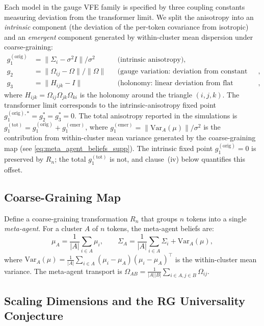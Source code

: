 \documentclass[twoside,11pt]{article}
\begin{document}
Each model in the gauge VFE family is specified by three coupling constants measuring deviation from the transformer limit. We split the anisotropy into an \emph{intrinsic} component (the deviation of the per-token covariance from isotropic) and an \emph{emergent} component generated by within-cluster mean dispersion under coarse-graining:
\begin{align}
g_1^{(\mathrm{orig})} &= \|\Sigma_i - \sigma^2 I\| / \sigma^2 & &\text{(intrinsic anisotropy)}, \label{eq:g1_def_supp} \\
g_2 &= \|\Omega_{ij} - \Omega\| / \|\Omega\| & &\text{(gauge variation: deviation from constant transport)}, \label{eq:g2_def_supp} \\
g_3 &= \|H_{ijk} - I\| & &\text{(holonomy: linear deviation from flat bundle)}, \label{eq:g3_def_supp}
\end{align}
where $H_{ijk} = \Omega_{ij} \Omega_{jk} \Omega_{ki}$ is the holonomy around the triangle $(i,j,k)$. The transformer limit corresponds to the intrinsic-anisotropy fixed point $g_1^{(\mathrm{orig}),*} = g_2^* = g_3^* = 0$. The total anisotropy reported in the simulations is $g_1^{(\mathrm{tot})} = g_1^{(\mathrm{orig})} + g_1^{(\mathrm{emer})}$, where $g_1^{(\mathrm{emer})} = \|\mathrm{Var}_A(\mu)\|/\sigma^2$ is the contribution from within-cluster mean variance generated by the coarse-graining map (see \eqref{eq:meta_agent_beliefs_supp}). The intrinsic fixed point $g_1^{(\mathrm{orig})} = 0$ is preserved by $R_n$; the total $g_1^{(\mathrm{tot})}$ is not, and clause~(iv) below quantifies this offset.

\subsection{Coarse-Graining Map}

Define a coarse-graining transformation $R_n$ that groups $n$ tokens into a single \emph{meta-agent}. For a cluster $A$ of $n$ tokens, the meta-agent beliefs are:
\begin{equation}
\mu_A = \frac{1}{|A|} \sum_{i \in A} \mu_i, \qquad
\Sigma_A = \frac{1}{|A|} \sum_{i \in A} \Sigma_i + \mathrm{Var}_A(\mu),
\label{eq:meta_agent_beliefs_supp}
\end{equation}
where $\mathrm{Var}_A(\mu) = \frac{1}{|A|} \sum_{i \in A} (\mu_i - \mu_A)(\mu_i - \mu_A)^\top$ is the within-cluster mean variance. The meta-agent transport is $\Omega_{AB} = \frac{1}{|A||B|} \sum_{i \in A, j \in B} \Omega_{ij}$.

\subsection{Scaling Dimensions and the RG Universality Conjecture}
\end{document}
